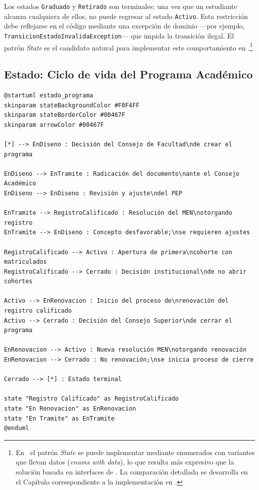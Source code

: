 Los estados \texttt{Graduado} y \texttt{Retirado} son terminales: una vez
que un estudiante alcanza cualquiera de ellos, no puede regresar al estado
\texttt{Activo}. Esta restricción debe reflejarse en el código mediante
una excepción de dominio ---por ejemplo, \texttt{TransicionEstadoInvalidaException}---
que impida la transición ilegal. El patrón \textit{State} \cite{Gamma1994}
es el candidato natural para implementar este comportamiento en \java.\footnote{%
  En \rust\, el patrón \textit{State} se puede implementar mediante enumerados
  con variantes que llevan datos (\textit{enums with data}), lo que resulta
  más expresivo que la solución basada en interfaces de \java. La comparación
  detallada se desarrolla en el Capítulo correspondiente a la implementación
  en \rust.}

\subsection*{Estado: Ciclo de vida del Programa Académico}

\begin{lstlisting}[style=plantumlStyle,
  caption={Diagrama de estado: ciclo de vida del \texttt{ProgramaAcademico}
    (PlantUML).},
  label={lst:plantuml-estado-programa}]
@startuml estado_programa
skinparam stateBackgroundColor #F0F4FF
skinparam stateBorderColor #00467F
skinparam arrowColor #00467F

[*] --> EnDiseno : Decisión del Consejo de Facultad\nde crear el programa

EnDiseno --> EnTramite : Radicación del documento\nante el Consejo Académico
EnDiseno --> EnDiseno : Revisión y ajuste\ndel PEP

EnTramite --> RegistroCalificado : Resolución del MEN\notorgando registro
EnTramite --> EnDiseno : Concepto desfavorable;\nse requieren ajustes

RegistroCalificado --> Activo : Apertura de primera\ncohorte con matriculados
RegistroCalificado --> Cerrado : Decisión institucional\nde no abrir cohortes

Activo --> EnRenovacion : Inicio del proceso de\nrenovación del registro calificado
Activo --> Cerrado : Decisión del Consejo Superior\nde cerrar el programa

EnRenovacion --> Activo : Nueva resolución MEN\notorgando renovación
EnRenovacion --> Cerrado : No renovación;\nse inicia proceso de cierre

Cerrado --> [*] : Estado terminal

state "Registro Calificado" as RegistroCalificado
state "En Renovacion" as EnRenovacion
state "En Tramite" as EnTramite
@enduml
\end{lstlisting}

